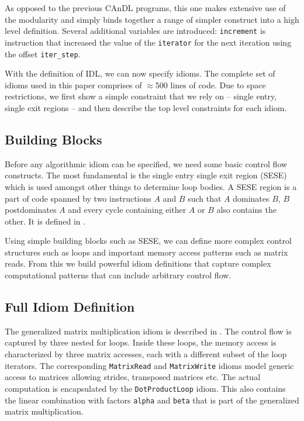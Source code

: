     As opposed to the previous CAnDL programs, this one makes extensive use of
    the modularity and simply binds together a range of simpler construct into
    a high level definition.
    Several additional variables are introduced: {\tt increment} is instruction
    that increased the value of the {\tt iterator} for the next iteration using
    the offset {\tt iter\_step}.

    With the definition of IDL, we can now specify idioms.
    The complete set of idioms used in this paper comprises of $\approx$500
    lines of code.
    Due to space restrictions, we first show a simple constraint that we rely
    on -- single entry, single exit regions -- and then describe the top level
    constraints for each idiom.

\subsection{Building Blocks}

    Before any algorithmic idiom can be specified, we need some basic control
    flow constructs.
    The most fundamental is the single entry single exit region (SESE)
    \cite{johnson1994program} which is used amongst other things to determine
    loop bodies.
    A SESE region is a part of code spanned by two instructions $A$ and $B$ such
    that $A$ dominates $B$, $B$ postdominates $A$ and every cycle containing
    either $A$ or $B$ also contains the other.
    It is defined in .

    Using simple building blocks such as SESE, we can define more complex
    control structures such as loops and important memory access patterns such
    as matrix reads.
    From this we build powerful idiom definitions that capture complex
    computational patterns that can include arbitrary control flow.

\subsection{Full Idiom Definition}

    The generalized matrix multiplication idiom is described in .
    The control flow is captured by three nested for loops.
    Inside these loops, the memory access is characterized by three matrix
    accesses, each with a different subset of the loop iterators.
    The corresponding \texttt{MatrixRead} and \texttt{MatrixWrite} idioms model
    generic access to matrices allowing strides, transposed matrices etc.
    The actual computation is encapsulated by the \texttt{DotProductLoop} idiom.
    This also contains the linear combination with factors \texttt{alpha} and
    \texttt{beta} that is part of the generalized matrix multiplication.


